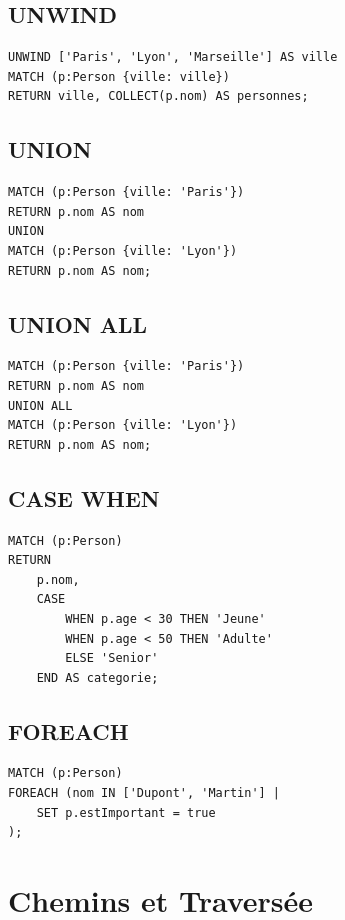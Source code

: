 \documentclass[11pt,a4paper]{article}
\begin{document}
\subsection{UNWIND}

\begin{lstlisting}
UNWIND ['Paris', 'Lyon', 'Marseille'] AS ville
MATCH (p:Person {ville: ville})
RETURN ville, COLLECT(p.nom) AS personnes;
\end{lstlisting}

\subsection{UNION}

\begin{lstlisting}
MATCH (p:Person {ville: 'Paris'})
RETURN p.nom AS nom
UNION
MATCH (p:Person {ville: 'Lyon'})
RETURN p.nom AS nom;
\end{lstlisting}

\subsection{UNION ALL}

\begin{lstlisting}
MATCH (p:Person {ville: 'Paris'})
RETURN p.nom AS nom
UNION ALL
MATCH (p:Person {ville: 'Lyon'})
RETURN p.nom AS nom;
\end{lstlisting}

\subsection{CASE WHEN}

\begin{lstlisting}
MATCH (p:Person)
RETURN 
    p.nom,
    CASE 
        WHEN p.age < 30 THEN 'Jeune'
        WHEN p.age < 50 THEN 'Adulte'
        ELSE 'Senior'
    END AS categorie;
\end{lstlisting}

\subsection{FOREACH}

\begin{lstlisting}
MATCH (p:Person)
FOREACH (nom IN ['Dupont', 'Martin'] |
    SET p.estImportant = true
);
\end{lstlisting}

\newpage

\section{Chemins et Traversée}
\end{document}

